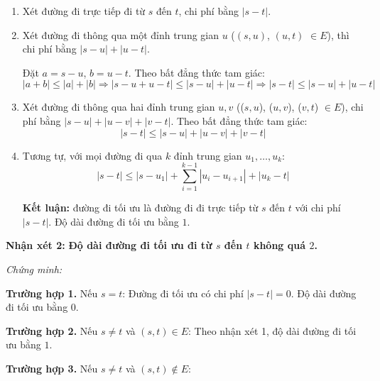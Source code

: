 \documentclass[12pt,a4paper]{article}
\begin{document}
	\begin{enumerate}
		\item Xét đường đi trực tiếp đi từ $s$ đến $t$, chi phí bằng $|s - t|$.  
	 	\item Xét đường đi thông qua một đỉnh trung gian $u$ ($(s, u)$, $(u, t)$ $\in E$), thì chi phí bằng $|s - u| + |u - t|$.
	
	Đặt $a = s - u$, $b = u - t$.  
	Theo bất đẳng thức tam giác:
	\[
	|a + b| \le |a| + |b|
	\Rightarrow |s - u + u - t| \le |s - u| + |u - t|
	\Rightarrow |s - t| \le |s - u| + |u - t|
	\]
	
		\item Xét đường đi thông qua hai đỉnh trung gian $u, v$ (($s, u$), ($u, v$), ($v, t$) $\in E$), chi phí bằng $|s - u| + |u - v| + |v - t|$.
	Theo bất đẳng thức tam giác:
	\[
	|s - t| \le |s - u| + |u - v| + |v - t|
	\]
	
	\item Tương tự, với mọi đường đi qua $k$ đỉnh trung gian $u_1, \ldots, u_k$:
	\[
	|s - t| \le |s - u_1| + \sum_{i=1}^{k-1}|u_i - u_{i+1}| + |u_k - t|
	\]

	
	\textbf{Kết luận:} đường đi tối ưu là đường đi đi trực tiếp từ $s$ đến $t$ với chi phí $|s-t|$. Độ dài đường đi tối ưu bằng $1$.
	\end{enumerate}		
	\textbf{Nhận xét 2:}  
	\textbf{Độ dài đường đi tối ưu đi từ $s$ đến $t$ không quá $2$.}
	
	\textit{Chứng minh:}
	
	\textbf{Trường hợp 1.} Nếu $s = t$:  
	Đường đi tối ưu có chi phí $|s - t| = 0$. Độ dài đường đi tối ưu bằng $0$.
	
	\textbf{Trường hợp 2.} Nếu $s \ne t$ và $(s, t) \in E$:  
	Theo nhận xét 1, độ dài đường đi tối ưu bằng $1$.
	
	\textbf{Trường hợp 3.} Nếu $s \ne t$ và $(s, t) \notin E$:  
	
\end{document}
